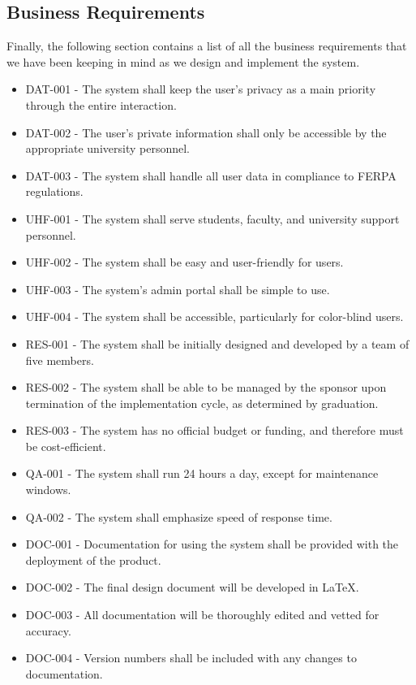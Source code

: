 \documentclass[titlepage, 12pt]{article}
\begin{document}
\subsection{Business Requirements}

Finally, the following section contains a list of all the business requirements that we have been keeping in mind as we design and implement the system.

\begin{itemize}
    \item DAT-001 - The system shall keep the user's privacy as a main priority through the entire interaction.
    \item DAT-002 - The user's private information shall only be accessible by the appropriate university personnel.
    \item DAT-003 - The system shall handle all user data in compliance to FERPA regulations.
    \item UHF-001 - The system shall serve students, faculty, and university support personnel.
    \item UHF-002 - The system shall be easy and user-friendly for users.
    \item UHF-003 - The system's admin portal shall be simple to use.
    \item UHF-004 - The system shall be accessible, particularly for color-blind users.
    \item RES-001 - The system shall be initially designed and developed by a team of five members.
    \item RES-002 - The system shall be able to be managed by the sponsor upon termination of the implementation cycle, as determined by graduation.
    \item RES-003 - The system has no official budget or funding, and therefore must be cost-efficient.
    \item QA-001 - The system shall run 24 hours a day, except for maintenance windows.
    \item QA-002 - The system shall emphasize speed of response time.
    \item DOC-001 - Documentation for using the system shall be provided with the deployment of the product.
    \item DOC-002 - The final design document will be developed in LaTeX.
    \item DOC-003 - All documentation will be thoroughly edited and vetted for accuracy.
    \item DOC-004 - Version numbers shall be included with any changes to documentation.
\end{itemize}
\end{document}
